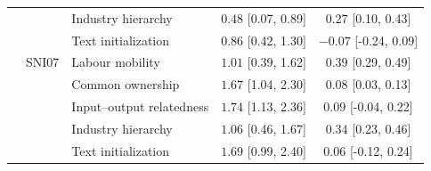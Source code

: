 \documentclass[9pt,twoside]{pnas-new}
\begin{document}
\begin{table}[H]
\begin{tabular}{lllcc}
 &  & Industry hierarchy & $0.48$ [0.07, 0.89] & $0.27$ [0.10, 0.43] \\
 &  & Text initialization & $0.86$ [0.42, 1.30] & $-0.07$ [-0.24, 0.09] \\
\addlinespace[2pt]
 & SNI07 & Labour mobility & $1.01$ [0.39, 1.62] & $0.39$ [0.29, 0.49] \\
 &  & Common ownership & $1.67$ [1.04, 2.30] & $0.08$ [0.03, 0.13] \\
 &  & Input--output relatedness & $1.74$ [1.13, 2.36] & $0.09$ [-0.04, 0.22] \\
 &  & Industry hierarchy & $1.06$ [0.46, 1.67] & $0.34$ [0.23, 0.46] \\
 &  & Text initialization & $1.69$ [0.99, 2.40] & $0.06$ [-0.12, 0.24] \\
\bottomrule
\end{tabular}
\end{table}
\end{document}
